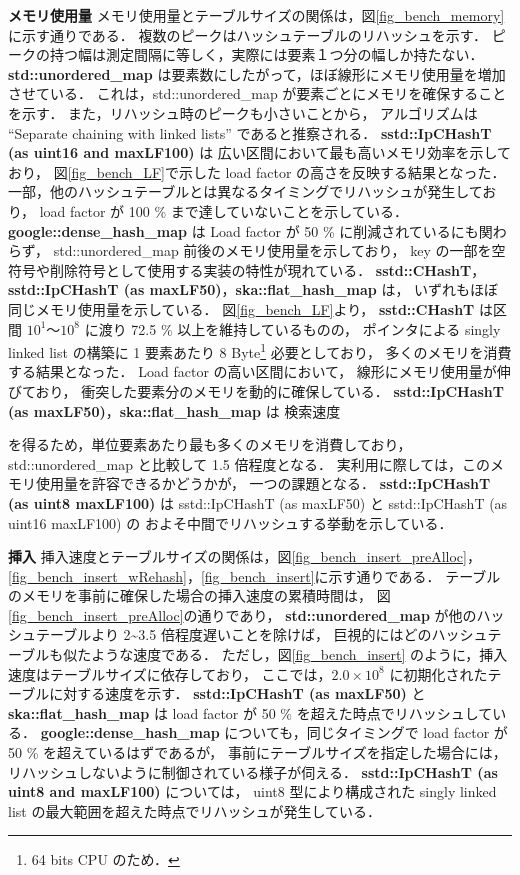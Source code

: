 %
{\bf メモリ使用量}
\samepage\newline\indent
メモリ使用量とテーブルサイズの関係は，図\ref{fig_bench_memory}に示す通りである．
複数のピークはハッシュテーブルのリハッシュを示す．
ピークの持つ幅は測定間隔に等しく，実際には要素１つ分の幅しか持たない．
{\bf std::unordered\_map} は要素数にしたがって，ほぼ線形にメモリ使用量を増加させている．
これは，std::unordered\_map が要素ごとにメモリを確保することを示す．
また，リハッシュ時のピークも小さいことから，
アルゴリズムは ``Separate chaining with linked lists'' であると推察される．
{\bf sstd::IpCHashT (as uint16 and maxLF100)} は
広い区間において最も高いメモリ効率を示しており，
図\ref{fig_bench_LF}で示した load factor の高さを反映する結果となった．
一部，他のハッシュテーブルとは異なるタイミングでリハッシュが発生しており，
load factor が 100 \% まで達していないことを示している．
{\bf google::dense\_hash\_map} は
Load factor が 50 \% に削減されているにも関わらず，
std::unordered\_map 前後のメモリ使用量を示しており，
key の一部を空符号や削除符号として使用する実装の特性が現れている．
{\bf sstd::CHashT}，{\bf sstd::IpCHashT (as maxLF50)}，{\bf ska::flat\_hash\_map} は，
いずれもほぼ同じメモリ使用量を示している．
図\ref{fig_bench_LF}より，
{\bf sstd::CHashT} は区間 $10^1〜10^8$ に渡り 72.5 \% 以上を維持しているものの，
ポインタによる singly linked list の構築に 1 要素あたり 8 Byte\footnote{64 bits CPU のため．} 必要としており，
多くのメモリを消費する結果となった．
Load factor の高い区間において，
線形にメモリ使用量が伸びており，
衝突した要素分のメモリを動的に確保している．
{\bf sstd::IpCHashT (as maxLF50)}，{\bf ska::flat\_hash\_map} は
検索速度

\noindent
を得るため，単位要素あたり最も多くのメモリを消費しており，
std::unordered\_map と比較して 1.5 倍程度となる．
実利用に際しては，このメモリ使用量を許容できるかどうかが，
一つの課題となる．
{\bf sstd::IpCHashT (as uint8 maxLF100)} は
sstd::IpCHashT (as maxLF50) と sstd::IpCHashT (as uint16 maxLF100) の
およそ中間でリハッシュする挙動を示している．
\leavevmode \newline

%
{\bf 挿入}
\samepage\newline\indent
挿入速度とテーブルサイズの関係は，図\ref{fig_bench_insert_preAlloc}，\ref{fig_bench_insert_wRehash}，\ref{fig_bench_insert}に示す通りである．
テーブルのメモリを事前に確保した場合の挿入速度の累積時間は，
図\ref{fig_bench_insert_preAlloc}の通りであり，
{\bf std::unordered\_map} が他のハッシュテーブルより 2\textasciitilde 3.5 倍程度遅いことを除けば，
巨視的にはどのハッシュテーブルも似たような速度である．
ただし，図\ref{fig_bench_insert} のように，挿入速度はテーブルサイズに依存しており，
ここでは，$2.0\times10^8$ に初期化されたテーブルに対する速度を示す．
{\bf sstd::IpCHashT (as maxLF50)} と {\bf ska::flat\_hash\_map} は load factor が 50 \% を超えた時点でリハッシュしている．
{\bf google::dense\_hash\_map} についても，同じタイミングで load factor が 50 \% を超えているはずであるが，
事前にテーブルサイズを指定した場合には，リハッシュしないように制御されている様子が伺える．
{\bf sstd::IpCHashT (as uint8 and maxLF100)} については，
uint8 型により構成された singly linked list の最大範囲を超えた時点でリハッシュが発生している．


